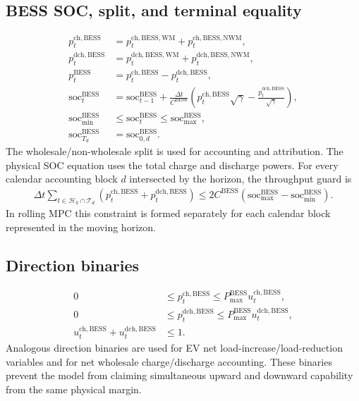 \documentclass[final,5p,times]{elsarticle}
\newcommand{\DeltaT}{\Delta t}
\newcommand{\BESS}{\mathrm{BESS}}
\newcommand{\soc}{\mathrm{soc}}
\newcommand{\WM}{\mathrm{WM}}
\newcommand{\NWM}{\mathrm{NWM}}
\newcommand{\ch}{\mathrm{ch}}
\newcommand{\dch}{\mathrm{dch}}
\newcommand{\calH}{\mathcal{H}}
\newcommand{\calT}{\mathcal{T}}
\begin{document}
\subsection{BESS SOC, split, and terminal equality}
\begin{align}
p_t^{\ch,\BESS}&=p_t^{\ch,\BESS,\WM}+p_t^{\ch,\BESS,\NWM},\label{eq:app_bess_chsplit}\\
p_t^{\dch,\BESS}&=p_t^{\dch,\BESS,\WM}+p_t^{\dch,\BESS,\NWM},\label{eq:app_bess_dchsplit}\\
p_t^{\BESS}&=p_t^{\ch,\BESS}-p_t^{\dch,\BESS},\label{eq:app_bess_power}\\
\soc_t^{\BESS}&=\soc_{t-1}^{\BESS}+\frac{\DeltaT}{C^{\BESS}}
\left(p_t^{\ch,\BESS}\sqrt{\gamma}-\frac{p_t^{\dch,\BESS}}{\sqrt{\gamma}}\right),\label{eq:app_bess_soc}\\
\soc_{\min}^{\BESS}&\le \soc_t^{\BESS}\le \soc_{\max}^{\BESS},\label{eq:app_bess_bounds}\\
\soc_{T_d}^{\BESS}&=\soc_{0,d}^{\BESS}.\label{eq:app_bess_terminal}
\end{align}
The wholesale/non-wholesale split is used for accounting and attribution. The physical SOC equation uses the total charge and discharge powers. For every calendar accounting block $d$ intersected by the horizon, the throughput guard is
\begin{align}
\DeltaT\sum_{t\in\calH_k\cap\calT_d}
\left(p_t^{\ch,\BESS}+p_t^{\dch,\BESS}\right)
\le 2C^{\BESS}\left(\soc_{\max}^{\BESS}-\soc_{\min}^{\BESS}\right).
\label{eq:app_bess_throughput}
\end{align}
In rolling MPC this constraint is formed separately for each calendar block represented in the moving horizon.

\subsection{Direction binaries}
\begin{align}
0&\le p_t^{\ch,\BESS}\le P_{\max}^{\BESS}u_t^{\ch,\BESS},\label{eq:app_bess_chbin}\\
0&\le p_t^{\dch,\BESS}\le P_{\max}^{\BESS}u_t^{\dch,\BESS},\label{eq:app_bess_dchbin}\\
u_t^{\ch,\BESS}+u_t^{\dch,\BESS}&\le 1.\label{eq:app_bess_dirbin}
\end{align}
Analogous direction binaries are used for EV net load-increase/load-reduction variables and for net wholesale charge/discharge accounting. These binaries prevent the model from claiming simultaneous upward and downward capability from the same physical margin.
\end{document}
